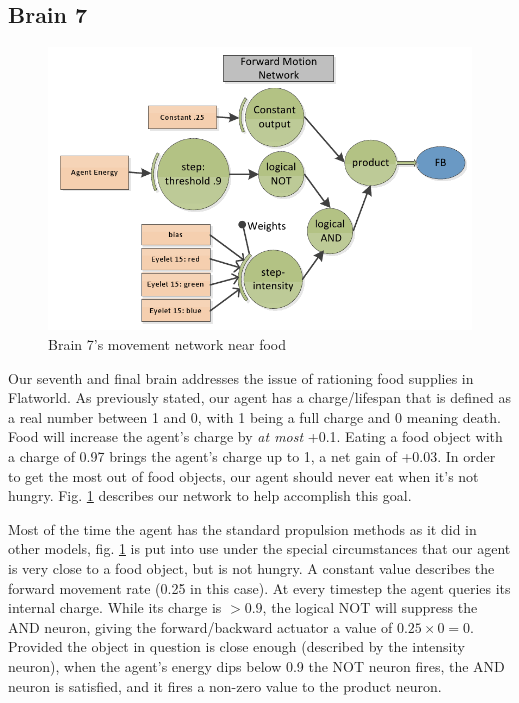 \subsection{Brain 7}
\begin{figure}
\begin{center}
  \includegraphics[scale=.5]{img/brain7.png}
  \caption{Brain 7's movement network near food}
  \label{fig:brain7}
\end{center}
\end{figure}

Our seventh and final brain addresses the issue of rationing food supplies in
Flatworld. As previously stated, our agent has a charge/lifespan that is defined
as a real number between 1 and 0, with 1 being a full charge and 0 meaning 
death. Food will increase the agent's charge by \emph{at most} +0.1. Eating 
a food object with a charge of 0.97 brings the agent's charge up to 1, a net
gain of +0.03. In order to get the most out of food objects, our agent
should never eat when it's not hungry. Fig. \ref{fig:brain7} describes our
network to help accomplish this goal.

 Most of the time the agent has the standard propulsion methods as it did in 
other models, fig. \ref{fig:brain7} is put into use under the special 
circumstances that our agent is very close to a food object, but is not hungry.
A constant value describes the forward movement rate (0.25 in this case). At 
every timestep the agent queries its internal charge. While its charge is 
$> 0.9$, the logical NOT will suppress the AND neuron, giving the 
forward/backward 
actuator a value of $0.25 \times 0 = 0$. Provided the object in question is 
close enough (described by the intensity neuron), when the agent's energy dips
below 0.9 the NOT neuron fires, the AND neuron is satisfied, and it fires a
non-zero value to the product neuron.
